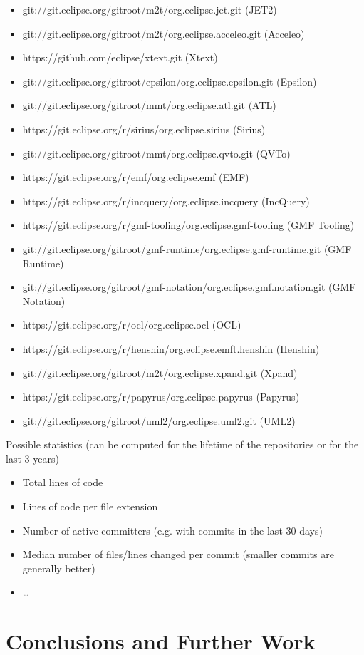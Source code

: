 \documentclass[runningheads,a4paper]{llncs}
\begin{document}
\begin{itemize}
  \item git://git.eclipse.org/gitroot/m2t/org.eclipse.jet.git (JET2)
  \item git://git.eclipse.org/gitroot/m2t/org.eclipse.acceleo.git (Acceleo)
  \item https://github.com/eclipse/xtext.git (Xtext)
  \item git://git.eclipse.org/gitroot/epsilon/org.eclipse.epsilon.git (Epsilon)
  \item git://git.eclipse.org/gitroot/mmt/org.eclipse.atl.git (ATL)
  \item https://git.eclipse.org/r/sirius/org.eclipse.sirius (Sirius)
  \item git://git.eclipse.org/gitroot/mmt/org.eclipse.qvto.git (QVTo)
  \item https://git.eclipse.org/r/emf/org.eclipse.emf (EMF)
  \item https://git.eclipse.org/r/incquery/org.eclipse.incquery (IncQuery)
  \item https://git.eclipse.org/r/gmf-tooling/org.eclipse.gmf-tooling (GMF Tooling)
  \item git://git.eclipse.org/gitroot/gmf-runtime/org.eclipse.gmf-runtime.git (GMF Runtime)
  \item git://git.eclipse.org/gitroot/gmf-notation/org.eclipse.gmf.notation.git  (GMF Notation)
  \item https://git.eclipse.org/r/ocl/org.eclipse.ocl (OCL)
  \item https://git.eclipse.org/r/henshin/org.eclipse.emft.henshin (Henshin)
  \item git://git.eclipse.org/gitroot/m2t/org.eclipse.xpand.git (Xpand)
  \item https://git.eclipse.org/r/papyrus/org.eclipse.papyrus (Papyrus)
  \item git://git.eclipse.org/gitroot/uml2/org.eclipse.uml2.git (UML2)
\end{itemize}

Possible statistics (can be computed for the lifetime of the repositories or for the last 3 years)
\begin{itemize}
  \item Total lines of code
  \item Lines of code per file extension 
  \item Number of active committers (e.g. with commits in the last 30 days)
  \item Median number of files/lines changed per commit (smaller commits are generally better)
  \item \ldots
\end{itemize}

\section{Conclusions and Further Work}




\end{document}
